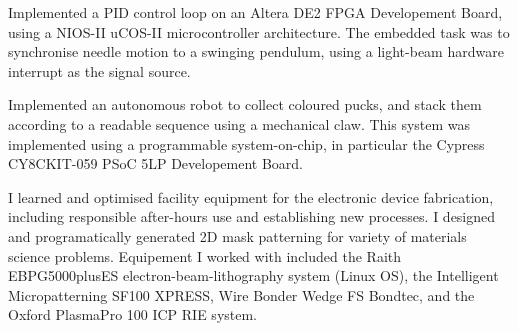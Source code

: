 \documentclass[10pt,a4paper,ragged2e,withhyper]{altacv}
\begin{document}
{		\divider


		Implemented a PID control loop on an Altera DE2 FPGA Developement Board, using a NIOS-II uCOS-II microcontroller architecture. 
		The embedded task was to synchronise needle motion to a swinging pendulum, using a light-beam hardware interrupt as the signal source.

		\divider


		Implemented an autonomous robot to collect coloured pucks, and stack them according to a readable sequence using a mechanical claw.
		This system was implemented using a programmable system-on-chip, in particular the Cypress CY8CKIT-059 PSoC 5LP Developement Board.

		\divider

		I learned and optimised facility equipment for the electronic device fabrication, including responsible after-hours use and establishing new processes.
		I designed and programatically generated 2D mask patterning for variety of materials science problems.  
		Equipement I worked with included the Raith EBPG5000plusES electron-beam-lithography system (Linux OS), 
		the Intelligent Micropatterning SF100 XPRESS, Wire Bonder Wedge FS Bondtec, and the Oxford PlasmaPro 100 ICP RIE system.
		}

			
\end{document}
